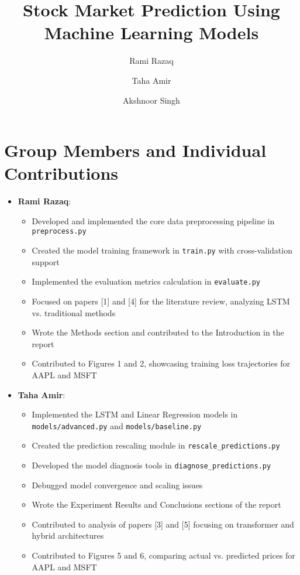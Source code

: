 \documentclass[sigconf]{acmart}
\title{Stock Market Prediction Using Machine Learning Models}
\author{Rami Razaq}
\affiliation{
  \institution{University of Houston}
  \city{Houston}
  \country{United States}
}
\author{Taha Amir}
\affiliation{
  \institution{University of Houston}
  \city{Houston}
  \country{United States}
}
\author{Akshnoor Singh}
\affiliation{
  \institution{University of Houston}
  \city{Houston}
  \country{United States}
}
\begin{document}
\maketitle

\section{Group Members and Individual Contributions}

\begin{itemize}
\item \textbf{Rami Razaq}: 
  \begin{itemize}
    \item Developed and implemented the core data preprocessing pipeline in \texttt{preprocess.py}
    \item Created the model training framework in \texttt{train.py} with cross-validation support
    \item Implemented the evaluation metrics calculation in \texttt{evaluate.py}
    \item Focused on papers [1] and [4] for the literature review, analyzing LSTM vs. traditional methods
    \item Wrote the Methods section and contributed to the Introduction in the report
    \item Contributed to Figures 1 and 2, showcasing training loss trajectories for AAPL and MSFT
  \end{itemize}

\item \textbf{Taha Amir}: 
  \begin{itemize}
    \item Implemented the LSTM and Linear Regression models in \texttt{models/advanced.py} and \texttt{models/baseline.py}
    \item Created the prediction rescaling module in \texttt{rescale\_predictions.py}
    \item Developed the model diagnosis tools in \texttt{diagnose\_predictions.py}
    \item Debugged model convergence and scaling issues
    \item Wrote the Experiment Results and Conclusions sections of the report
    \item Contributed to analysis of papers [3] and [5] focusing on transformer and hybrid architectures
    \item Contributed to Figures 5 and 6, comparing actual vs. predicted prices for AAPL and MSFT
  \end{itemize}


\end{itemize}
\end{document}
